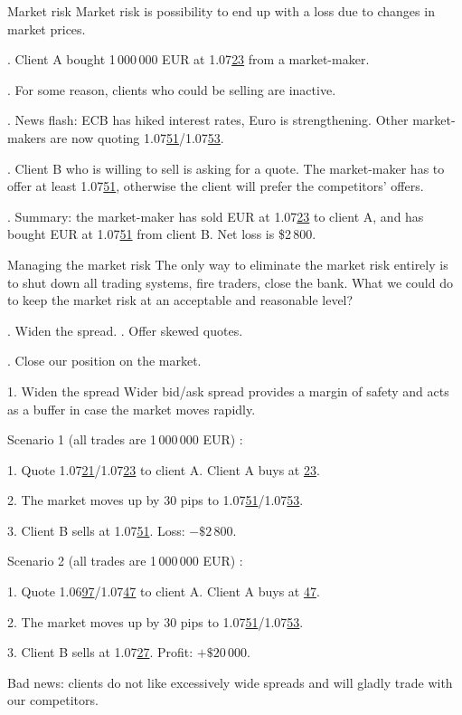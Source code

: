 \documentclass{beamer}
\begin{document}
\begin{frame}{Market risk}
\justify
\alert{Market risk} is possibility to end up with a loss due to changes in market prices.

. Client A bought 1\,000\,000 EUR at 1.07\underline{23} from a market-maker.

. For some reason, clients who could be selling are inactive.

. News flash: ECB has hiked interest rates, Euro is strengthening. Other market-makers are now quoting 1.07\underline{51}/1.07\underline{53}.

. Client B who is willing to sell is asking for a quote. The market-maker has to offer at least 1.07\underline{51}, otherwise the client will prefer the competitors' offers.

. Summary: the market-maker has sold EUR at 1.07\underline{23} to client A, and has bought EUR at 1.07\underline{51} from client B. Net loss is \$2\,800.
\end{frame}



\begin{frame}{Managing the market risk}
\justify
The only way to eliminate the market risk entirely is to shut down all trading systems, fire
traders, close the bank. What we could do to keep the market risk at an acceptable and reasonable level?

. Widen the spread.
. Offer skewed quotes.

. Close our position on the market.
\end{frame}



\begin{frame}{1. Widen the spread}
\justify
Wider bid/ask spread provides a margin of safety and acts as a buffer in case the market moves
rapidly.

\justify
Scenario 1 (all trades are 1\,000\,000 EUR) :

1. Quote 1.07\underline{21}/1.07\underline{23} to client A. Client A buys at \underline{23}.

2. The market moves up by 30 pips to 1.07\underline{51}/1.07\underline{53}.

3. Client B sells at 1.07\underline{51}. Loss: $-\$2\,800$.

\justify
Scenario 2 (all trades are 1\,000\,000 EUR) :

1. Quote 1.06\underline{97}/1.07\underline{47} to client A. Client A buys at \underline{47}.

2. The market moves up by 30 pips to 1.07\underline{51}/1.07\underline{53}.

3. Client B sells at 1.07\underline{27}. Profit: $+\$20\,000$.

\justify
Bad news: clients do not like excessively wide spreads and will gladly trade with our competitors.
\end{frame}
\end{document}
